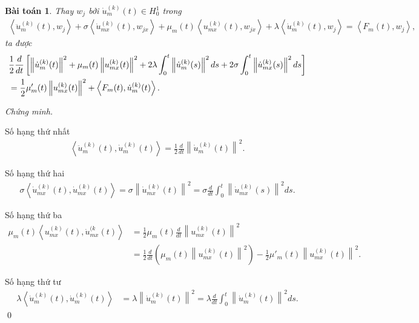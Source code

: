 \documentclass[12pt,a4paper]{article}
\newtheorem{theorem}{Bài toán}[section]
\theoremstyle{definition}
\begin{document}
\begin{theorem}
Thay $w_j$ bởi $\dot{u}_m^{(k)}(t) \in H^1_0$ trong
\begin{align*}
    \left<\ddot{u}_m^{(k)}(t), w_j\right>
    + \sigma \left<\dot{u}_{mx}^{(k)}(t), w_{jx}\right>
    + \mu_m(t) \left<u_{mx}^{(k)}(t), w_{jx}\right>
    + \lambda \left<\dot{u}_m^{(k)}(t), w_j\right>
    = \left<F_m(t), w_j\right>,
\end{align*}
ta được
\begin{align*}
    &\frac{1}{2} \frac{d}{dt} \left[ \left\|\dot{u}_m^{(k)}(t)\right\|^2 + \mu_m(t) \left\|u_{mx}^{(k)}(t)\right\|^2 + 2 \lambda \int_0^t \left\|\dot{u}_m^{(k)}(s)\right\|^2  ds + 2 \sigma \int_0^t \left\|\dot{u}_{mx}^{(k)}(s)\right\|^2  ds \right] \\
    &= \frac{1}{2} \mu'_m(t) \left\|u_{mx}^{(k)}(t)\right\|^2 + \left<F_m(t), \dot{u}_m^{(k)}(t)\right>. \notag
\end{align*}
\end{theorem}

\textit{Chứng minh.}

Số hạng thứ nhất
\begin{align*}
    \left<\ddot{u}_m^{(k)}(t), \dot{u}_m^{(k)}(t)\right>
    = \frac{1}{2} \frac{d}{dt} \left\|\dot{u}_m^{(k)}(t)\right\|^2.
\end{align*}

Số hạng thứ hai
\begin{align*}
    \sigma \left<\dot{u}_{mx}^{(k)}(t), \dot{u}_{mx}^{(k)}(t)\right>
    = \sigma \left\|\dot{u}_{mx}^{(k)}(t)\right\|^2
    = \sigma \frac{d}{dt} \int_0^t \left\|\dot{u}_{mx}^{(k)}(s)\right\|^2 ds.
\end{align*}

Số hạng thứ ba
\begin{align*}
    \mu_m(t) \left<u_{mx}^{(k)}(t), \dot{u}_{mx}^{(k}(t)\right>
    &= \frac{1}{2} \mu_m(t) \frac{d}{dt} \left\|u_{mx}^{(k)}(t)\right\|^2 \\
    &= \frac{1}{2} \frac{d}{dt} \left(\mu_m(t) \left\|u_{mx}^{(k)}(t)\right\|^2\right) - \frac{1}{2} \mu'_m(t) \left\|u_{mx}^{(k)}(t)\right\|^2.
\end{align*}

Số hạng thứ tư
\begin{align*}
    \lambda \left<\dot{u}_m^{(k)}(t), \dot{u}_m^{(k)}(t)\right>
    &= \lambda \left\|\dot{u}_m^{(k)}(t)\right\|^2
    = \lambda \frac{d}{dt} \int_0^t \left\|\dot{u}_m^{(k)}(t)\right\|^2 ds.
\end{align*} \qed
\end{document}
